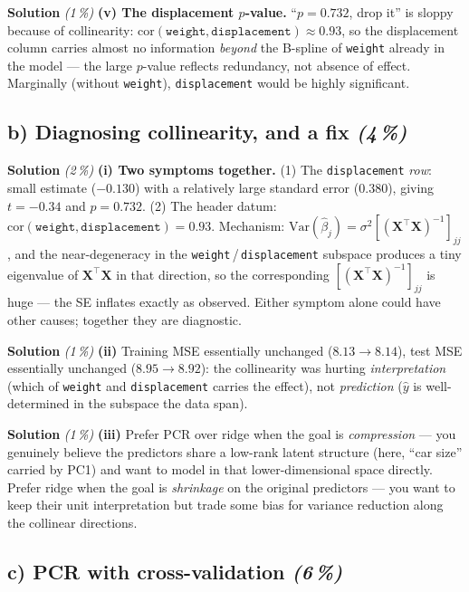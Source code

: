 \documentclass[11pt,a4paper]{article}
\newcommand{\subpoints}[1]{\textit{(#1\,\%)}}
\newcommand{\sol}{\noindent\textbf{Solution}}
\begin{document}
\medskip
\sol{} \subpoints{1} \textbf{(v) The displacement $p$-value.} ``$p = 0.732$, drop it'' is sloppy
because of collinearity: $\mathrm{cor}(\texttt{weight}, \texttt{displacement}) \approx 0.93$, so the
displacement column carries almost no information \emph{beyond} the B-spline of \texttt{weight}
already in the model --- the large $p$-value reflects redundancy, not absence of effect. Marginally
(without \texttt{weight}), \texttt{displacement} would be highly significant.

\subsection*{b) Diagnosing collinearity, and a fix \subpoints{4}}

\sol{} \subpoints{2} \textbf{(i) Two symptoms together.} (1) The \texttt{displacement} \emph{row}:
small estimate ($-0.130$) with a relatively large standard error ($0.380$), giving $t=-0.34$ and
$p=0.732$. (2) The header datum: $\mathrm{cor}(\texttt{weight}, \texttt{displacement})=0.93$.
Mechanism: $\mathrm{Var}(\hat\beta_j) = \sigma^2[(\mathbf X^\top\mathbf X)^{-1}]_{jj}$, and the
near-degeneracy in the \texttt{weight}\,/\,\texttt{displacement} subspace produces a tiny eigenvalue
of $\mathbf X^\top\mathbf X$ in that direction, so the corresponding $[(\mathbf X^\top\mathbf X)^{-1}]_{jj}$
is huge --- the SE inflates exactly as observed. Either symptom alone could have other causes;
together they are diagnostic.

\medskip
\sol{} \subpoints{1} \textbf{(ii)} Training MSE essentially unchanged ($8.13 \to 8.14$), test MSE
essentially unchanged ($8.95 \to 8.92$): the collinearity was hurting \emph{interpretation}
(which of \texttt{weight} and \texttt{displacement} carries the effect), not \emph{prediction}
($\hat y$ is well-determined in the subspace the data span).

\medskip
\sol{} \subpoints{1} \textbf{(iii)} Prefer PCR over ridge when the goal is \emph{compression} ---
you genuinely believe the predictors share a low-rank latent structure (here, ``car size'' carried
by PC1) and want to model in that lower-dimensional space directly. Prefer ridge when the goal is
\emph{shrinkage} on the original predictors --- you want to keep their unit interpretation but
trade some bias for variance reduction along the collinear directions.

\subsection*{c) PCR with cross-validation \subpoints{6}}
\end{document}
